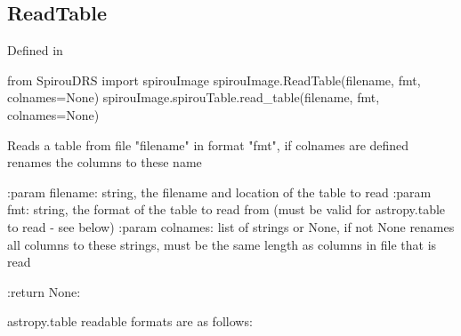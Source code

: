 \noindent\begin{minipage}{\textwidth}
\subsection{ReadTable}

Defined in \spirouImage{}

\begin{pythonbox}
from SpirouDRS import spirouImage
spirouImage.ReadTable(filename, fmt, colnames=None)
spirouImage.spirouTable.read_table(filename, fmt, colnames=None)
\end{pythonbox}

\begin{pythondocstring}
Reads a table from file "filename" in format "fmt", if colnames are defined
renames the columns to these name

:param filename: string, the filename and location of the table to read
:param fmt: string, the format of the table to read from (must be valid
            for astropy.table to read - see below)
:param colnames: list of strings or None, if not None renames all columns
                 to these strings, must be the same length as columns
                 in file that is read

:return None:

astropy.table readable formats are as follows:
\end{pythondocstring}
\end{minipage}


